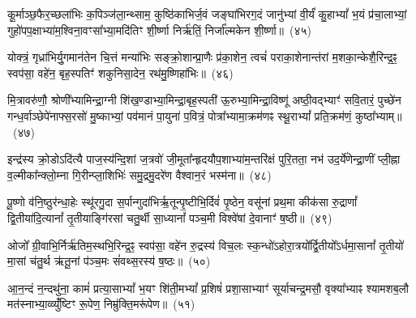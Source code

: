 {\anuvakamend[{वाजं॒ पञ्च॑विꣳशतिः}]}%

कू॒र्माञ्छ॒फैर॒च्छला॑भिः क॒पिञ्ज॑ला॒न्थ्साम॒ कुष्ठि॑काभिर्ज॒वं जङ्घा॑भिरग॒दं जानु॑भ्यां वी॒र्यं॑ कु॒हा\-भ्यां᳚ भ॒यं प्र॑चा॒लाभ्यां॒ गुहो॑पप॒क्षाभ्या॑म॒श्विना॒वꣳसा᳚भ्या॒मदि॑तिꣳ शी॒र्ष्णा निर्\mbox{}ऋ॑तिं॒ निर्जा᳚ल्मकेन शी॒र्ष्णा॥~(४५)\ip

{\anuvakamend[{कू॒र्मान्त्रयो॑विꣳशतिः}]}%

योक्त्रं॒ गृध्रा॑भिर्यु॒गमान॑तेन चि॒त्तं मन्या॑भिः सङ्क्रो॒शान्प्रा॒णैः प्र॑का॒शेन॒ त्वचं॑ पराका॒शेनान्त॑रां म॒शका॒न्केशै॒रिन्द्र॒ꣴ॒ स्वप॑सा॒ वहे॑न॒ बृह॒स्पतिꣳ॑ शकुनिसा॒देन॒ रथ॑मु॒ष्णिहा॑भिः॥~(४६)\ip

{\anuvakamend[{योक्त्र॒मेक॑विꣳशतिः}]}%

मि॒त्रावरु॑णौ॒ श्रोणी᳚भ्यामिन्द्रा॒ग्नी शि॑ख॒ण्डाभ्या॒मिन्द्रा॒बृह॒स्पती॑ ऊ॒रुभ्या॒मिन्द्रा॒विष्णू॑ अष्ठी॒वद्भ्याꣳ॑ सवि॒तारं॒ पुच्छे॑न गन्ध॒र्वाञ्छेपे॑नाफ्स॒रसो॑ मु॒ष्काभ्यां॒ पव॑मानं पा॒युना॑ प॒वित्रं॒ पोत्रा᳚भ्यामा॒क्रम॑णꣴ स्थू॒रा\-भ्यां᳚ प्रति॒क्रम॑णं॒ कुष्ठा᳚भ्याम्॥~(४७)\ip

{\anuvakamend[{}]}%

इन्द्र॑स्य क्रो॒डो\-ऽदि॑त्यै पाज॒स्य॑न्दि॒शां ज॒त्रवो॑ जी॒मूता᳚न्हृदयौप॒शाभ्या॑म॒न्तरि॑क्षं पुरि॒तता॒ नभ॑ उद॒र्ये॑णेन्द्रा॒णीं प्ली॒ह्ना व॒ल्मीका᳚न्क्लो॒म्ना गि॒रीन्प्ला॒शिभिः॑ समु॒द्रमु॒दरे॑ण वैश्वान॒रं भस्म॑ना॥~(४८)\ip

{\anuvakamend[{मि॒त्रावरु॑णा॒विन्द्र॑स्य॒ द्वाविꣳ॑शति॒र्द्वाविꣳ॑शतिः}]}%

पू॒ष्णो व॑नि॒ष्ठुर॑न्धा॒हेः स्थू॑रगु॒दा स॒र्पान्गुदा॑भिर्\mbox{}ऋ॒तून्पृ॒ष्टीभि॒र्दिवं॑ पृ॒ष्ठेन॒ वसू॑नां प्रथ॒मा कीक॑सा रु॒द्राणां᳚ द्वि॒तीया॑दि॒त्यानां᳚ तृ॒तीयाङ्गि॑रसां चतु॒र्थी सा॒ध्यानां᳚ पञ्च॒मी विश्वे॑षां दे॒वानाꣳ॑ ष॒ष्ठी॥~(४९)\ip

{\anuvakamend[{पू॒ष्णश्चतु॑र्विꣳशतिः}]}%

ओजो᳚ ग्री॒वाभि॒र्निर्\mbox{}ऋ॑तिम॒स्थभि॒रिन्द्र॒ꣴ॒ स्वप॑सा॒ वहे॑न रु॒द्रस्य॑ विच॒लः स्क॒न्धो॑\-ऽहोरा॒त्रयो᳚र्द्वि॒तीयो᳚\-ऽर्धमा॒सानां᳚ तृ॒तीयो॑ मा॒सां च॑तु॒र्थ ऋ॑तू॒नां प॑ञ्च॒मः सं॑वथ्स॒रस्य॑ ष॒ष्ठः॥~(५०)\ip

{\anuvakamend[{ओजो॑ विꣳश॒तिः}]}%

आ॒न॒न्दं न॒न्दथु॑ना॒ कामं॑ प्रत्या॒सा\-भ्यां᳚ भ॒यꣳ शि॑ती॒म\-भ्यां᳚ प्र॒शिषं॑ प्रशा॒साभ्याꣳ॑ सूर्याचन्द्र॒मसौ॒ वृक्या᳚भ्याꣴ श्यामशब॒लौ मत॑स्नाभ्या॒व्व्युँ॑ष्टिꣳ रू॒पेण॒ निम्रु॑क्ति॒मरू॑पेण॥~(५१)\ip

{\anuvakamend[{आ॒न॒न्दꣳ षोड॑श}]}%


